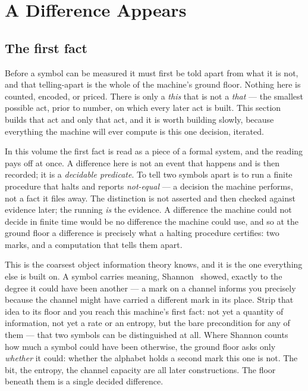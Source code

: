 \chapter{A Difference Appears}

\section{The first fact}

Before a symbol can be measured it must first be told apart from what it is not, and that telling-apart is the whole
of the machine's ground floor. Nothing here is counted, encoded, or priced. There is only a \emph{this} that is not a
\emph{that} --- the smallest possible act, prior to number, on which every later act is built. This section builds that
act and only that act, and it is worth building slowly, because everything the machine will ever compute is this one
decision, iterated.

In this volume the first fact is read as a piece of a formal system, and the reading pays off at once. A difference
here is not an event that happens and is then recorded; it is a \emph{decidable predicate}. To tell two symbols apart
is to run a finite procedure that halts and reports \emph{not-equal} --- a decision the machine performs, not a fact
it files away. The distinction is not asserted and then checked against evidence later; the running \emph{is} the
evidence. A difference the machine could not decide in finite time would be no difference the machine could use, and so
at the ground floor a difference is precisely what a halting procedure certifies: two marks, and a computation that
tells them apart.

This is the coarsest object information theory knows, and it is the one everything else is built on. A symbol carries
meaning, Shannon~\cite{shannon1948} showed, exactly to the degree it could have been another --- a mark on a channel
informs you precisely because the channel might have carried a different mark in its place. Strip that idea to its
floor and you reach this machine's first fact: not yet a quantity of information, not yet a rate or an entropy, but the
bare precondition for any of them --- that two symbols can be distinguished at all. Where Shannon counts how much a
symbol could have been otherwise, the ground floor asks only \emph{whether} it could: whether the alphabet holds a
second mark this one is not. The bit, the entropy, the channel capacity are all later constructions. The floor beneath
them is a single decided difference.

